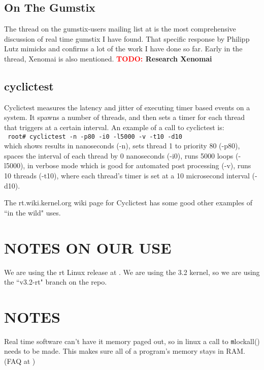 \documentclass{article}
\newcommand{\TODO}[1]{ {\bf \textcolor{red}{TODO:} #1 }}
\newcommand{\rootCom}[1]{\\\indent\indent\texttt{ \small root\# #1}\\}
\begin{document}
\subsection{On The Gumstix}
The thread on the gumstix-users mailing list at \cite{gumstixRtThread} is the most comprehensive discussion of real time gumstix I have found.  That specific response by Philipp Lutz mimicks and confirms a lot of the work I have done so far. Early in the thread, Xenomai \cite{xenomai} is also mentioned.  \TODO{Research Xenomai}

\subsection{cyclictest}
Cyclictest measures the latency and jitter of executing timer based events on a system.  It spawns a number of threads, and then sets a timer for each thread that triggers at a certain interval.  An example of a call to cyclictest is: \rootCom{cyclictest -n -p80 -i0 -l5000 -v -t10 -d10}which shows results in nanoseconds (-n), sets thread 1 to priority 80 (-p80), spaces the interval of each thread by 0 nanoseconds (-i0), runs 5000 loops (-l5000), in verbose mode which is good for automated post processing (-v), runs 10 threads (-t10), where each thread's timer is set at a 10 microsecond interval (-d10).

The rt.wiki.kernel.org wiki page for Cyclictest has some good other examples of ``in the wild" uses. \cite{rtWikiCyclicTest}


\section{NOTES ON OUR USE}
We are using the rt Linux release at \cite{RealTimeLinuxPatch}.  We are using the 3.2 kernel, so we are using the ``v3.2-rt" branch on the repo.

\section{NOTES}
Real time software can't have it memory paged out, so in linux a call to {\texttt mlockall()} needs to be made.  This makes sure all of a program's memory stays in RAM. (FAQ at \cite{RealTimeLinux})


\end{document}

